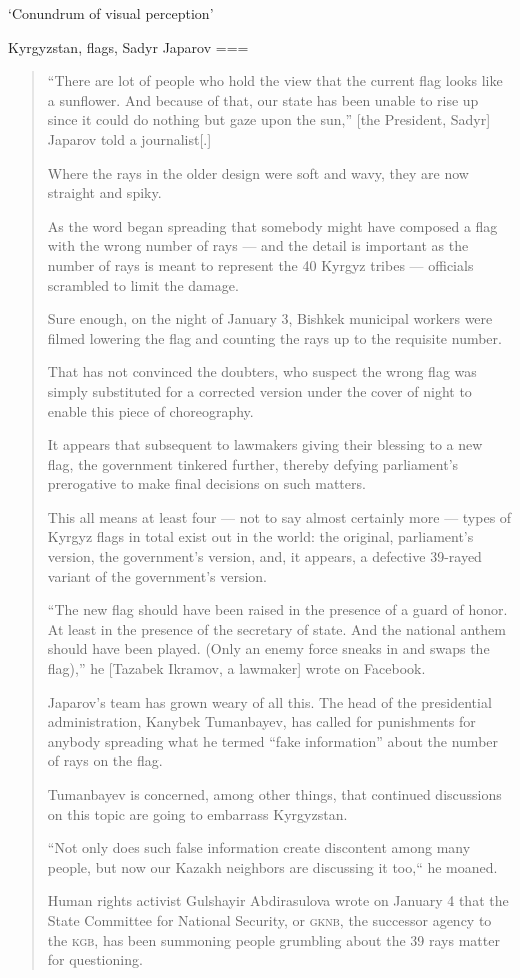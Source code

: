 ‘Conundrum of visual perception’

Kyrgyzstan, flags, Sadyr Japarov
===
\begin{quote}


    “There are lot of people who hold the view that the current flag looks like a sunflower. And because of that, our state has been unable to rise up since it could do nothing but gaze upon the sun,” [the President, Sadyr] Japarov told a journalist[.]

    Where the rays in the older design were soft and wavy, they are now straight and spiky.

    As the word began spreading that somebody might have composed a flag with the wrong number of rays — and the detail is important as the number of rays is meant to represent the 40 Kyrgyz tribes — officials scrambled to limit the damage.

    Sure enough, on the night of January 3, Bishkek municipal workers were filmed lowering the flag and counting the rays up to the requisite number.

    That has not convinced the doubters, who suspect the wrong flag was simply substituted for a corrected version under the cover of night to enable this piece of choreography.

    It appears that subsequent to lawmakers giving their blessing to a new flag, the government tinkered further, thereby defying parliament’s prerogative to make final decisions on such matters.

    This all means at least four — not to say almost certainly more — types of Kyrgyz flags in total exist out in the world: the original, parliament’s version, the government’s version, and, it appears, a defective 39-rayed variant of the government’s version.

    “The new flag should have been raised in the presence of a guard of honor. At least in the presence of the secretary of state. And the national anthem should have been played. (Only an enemy force sneaks in and swaps the flag),” he [Tazabek Ikramov, a lawmaker] wrote on Facebook.

    Japarov’s team has grown weary of all this. The head of the presidential administration, Kanybek Tumanbayev, has called for punishments for anybody spreading what he termed “fake information” about the number of rays on the flag.

    Tumanbayev is concerned, among other things, that continued discussions on this topic are going to embarrass Kyrgyzstan.

    “Not only does such false information create discontent among many people, but now our Kazakh neighbors are discussing it too,“ he moaned.

    Human rights activist Gulshayir Abdirasulova wrote on January 4 that the State Committee for National Security, or \textsc{gknb}, the successor agency to the \textsc{kgb}, has been summoning people grumbling about the 39 rays matter for questioning.
\end{quote}

\nocite{imanaliyeva2024}